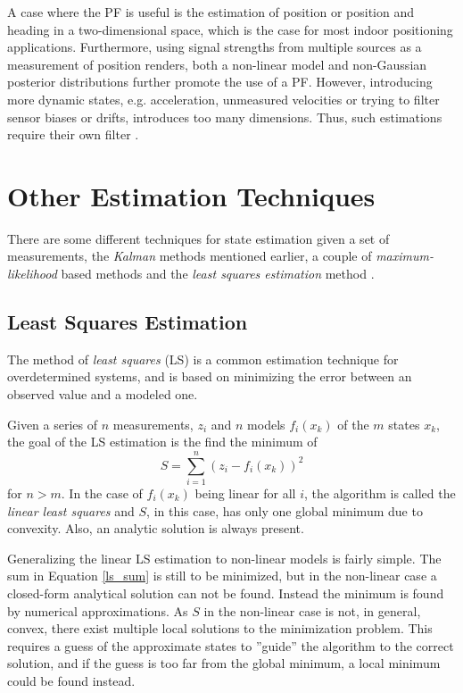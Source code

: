 \documentclass{LTHthesis}
\begin{document}
A case where the PF is useful is the estimation of position or position and heading in a two-dimensional space, which is the case for most indoor positioning applications. Furthermore, using signal strengths from multiple sources as a measurement of position renders, both a non-linear model and non-Gaussian posterior distributions further promote the use of a PF. However, introducing more dynamic states, e.g. acceleration, unmeasured velocities or trying to filter sensor biases or drifts, introduces too many dimensions. Thus, such estimations require their own filter \cite{gson12}.        
%
\section{Other Estimation Techniques}
\label{sec:oet}
%
There are some different techniques for state estimation given a set of measurements, the \emph{Kalman} methods mentioned earlier, a couple of \emph{maximum-likelihood} based methods and the \emph{least squares estimation} method \cite{gson12}.
%
 \subsection{Least Squares Estimation}
%
The method of \emph{least squares} (LS) is a common estimation technique for overdetermined systems, and is based on minimizing the error between an observed value and a modeled one. 

Given a series of $n$ measurements, $z_i$ and $n$ models $f_i(x_k)$ of the $m$ states $x_k$, the goal of the LS estimation is the find the minimum of
%
\begin{equation}
S = \sum_{i=1}^n(z_i-f_i(x_k))^2
\label{ls_sum}
\end{equation}
%
for $n>m$. In the case of $f_i(x_k)$ being linear for all $i$, the algorithm is called the \emph{linear least squares} and $S$, in this case, has only one global minimum due to convexity. Also, an analytic solution is always present.

Generalizing the linear LS estimation to non-linear models is fairly simple. The sum in Equation \ref{ls_sum} is still to be minimized, but in the non-linear case a closed-form analytical solution can not be found. Instead the minimum is found by numerical approximations. As $S$ in the non-linear case is not, in general, convex, there exist multiple local solutions to the minimization problem. This requires a guess of the approximate states to ''guide'' the algorithm to the correct solution, and if the guess is too far from the global minimum, a local minimum could be found instead.     
\end{document}
